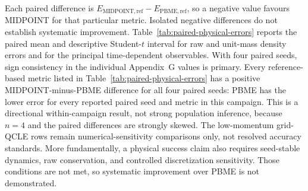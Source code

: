 \documentclass[
  11pt,
  letterpaper,
  onehalfspacing,
  normalmargins,
  equalmargins,
  oneside
]{ut-thesis}
\begin{document}
Each paired difference is
\(E_{\mathrm{MIDPOINT,ref}}-E_{\mathrm{PBME,ref}}\), so a negative value
favours MIDPOINT for that particular metric. Isolated negative differences do
not establish systematic improvement. Table~\ref{tab:paired-physical-errors}
reports the paired mean and descriptive Student-\(t\) interval for raw and
unit-mass density errors and for the principal time-dependent observables.
With four paired seeds, sign consistency in the individual Appendix~G values
is primary. Every reference-based metric listed in
Table~\ref{tab:paired-physical-errors} has a positive MIDPOINT-minus-PBME
difference for all four paired seeds: PBME has the lower error for every reported paired seed and metric
in this campaign. This is a directional
within-campaign result, not strong population inference, because \(n=4\) and
the paired differences are strongly skewed. The low-momentum grid-QCLE rows
remain numerical-sensitivity comparisons only, not resolved accuracy
standards. More fundamentally, a physical success claim also requires
seed-stable dynamics, raw conservation, and controlled discretization
sensitivity. Those conditions are not met, so systematic improvement over
PBME is not demonstrated.
\end{document}
